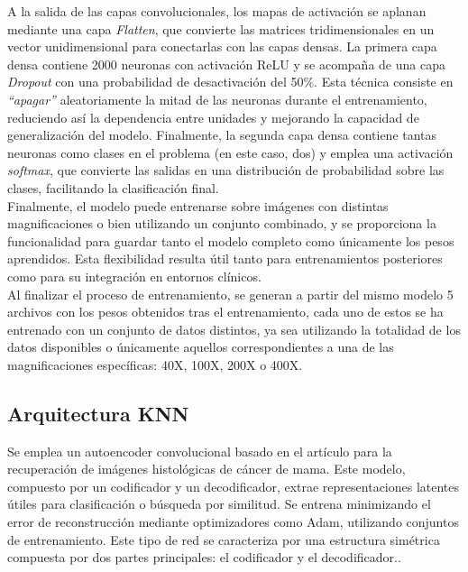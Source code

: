 \documentclass[12pt]{article} %
\begin{document}
A la salida de las capas convolucionales, los mapas de activación se aplanan mediante una capa \textit{Flatten}, que convierte las matrices tridimensionales en un vector unidimensional para conectarlas con las capas densas. La primera capa densa contiene 2000 neuronas con activación ReLU y se acompaña de una capa \textit{Dropout} con una probabilidad de desactivación del 50\%. Esta técnica consiste en \textit{“apagar”} aleatoriamente la mitad de las neuronas durante el entrenamiento, reduciendo así la dependencia entre unidades y mejorando la capacidad de generalización del modelo. Finalmente, la segunda capa densa contiene tantas neuronas como clases en el problema (en este caso, dos) y emplea una activación \textit{softmax}, que convierte las salidas en una distribución de probabilidad sobre las clases, facilitando la clasificación final.\\

Finalmente, el modelo puede entrenarse sobre imágenes con distintas magnificaciones o bien utilizando un conjunto combinado, y se proporciona la funcionalidad para guardar tanto el modelo completo como únicamente los pesos aprendidos. Esta flexibilidad resulta útil tanto para entrenamientos posteriores como para su integración en entornos clínicos.\\

Al finalizar el proceso de entrenamiento, se generan a partir del mismo modelo 5 archivos con los pesos obtenidos tras el entrenamiento, cada uno de estos se ha entrenado con un conjunto de datos distintos, ya sea utilizando la totalidad de los datos disponibles o únicamente aquellos correspondientes a una de las magnificaciones específicas: 40X, 100X, 200X o 400X. 

\subsection{Arquitectura KNN}
Se emplea un autoencoder convolucional basado en el artículo \cite{minarno2021cnn} para la recuperación de imágenes histológicas de cáncer de mama. Este modelo, compuesto por un codificador y un decodificador, extrae representaciones latentes útiles para clasificación o búsqueda por similitud. Se entrena minimizando el error de reconstrucción mediante optimizadores como Adam, utilizando conjuntos de entrenamiento. Este tipo de red se caracteriza por una estructura simétrica compuesta por dos partes principales: el codificador y el decodificador.. \\
\end{document}
